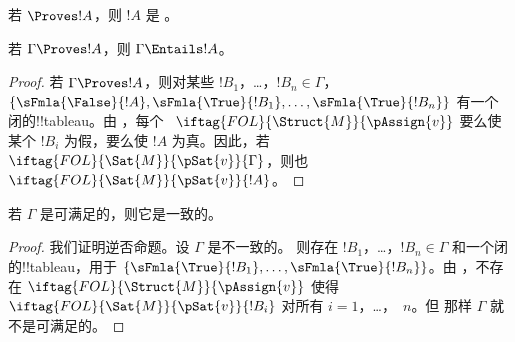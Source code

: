 \documentclass[../../../include/open-logic-section]{subfiles}
\begin{document}
\begin{cor}
若 $\Proves !A$，则 $!A$ 是 。
\end{cor}

\begin{cor}
若 $\Gamma \Proves !A$，则 $\Gamma \Entails !A$。
\end{cor}

\begin{proof}
  若 $\Gamma \Proves !A$，则对某些 $!B_1$，\dots，$!B_n \in
  \Gamma$，$\{\sFmla{\False}{!A}, \sFmla{\True}{!B_1}, \dots,
  \sFmla{\True}{!B_n}\}$ 有一个闭的!!{tableau}。由
  ，每个
  ~$\iftag{FOL}{\Struct{M}}{\pAssign{v}}$
  要么使某个 $!B_i$ 为假，要么使 $!A$ 为真。因此，若
  $\iftag{FOL}{\Sat{M}}{\pSat{v}}{\Gamma}$，则也
  $\iftag{FOL}{\Sat{M}}{\pSat{v}}{!A}$。
\end{proof}

\begin{cor}
若 $\Gamma$ 是可满足的，则它是一致的。
\end{cor}

\begin{proof}
我们证明逆否命题。设 $\Gamma$ 是不一致的。
则存在 $!B_1$，\dots，$!B_n \in \Gamma$ 和一个闭的!!{tableau}，用于 $\{\sFmla{\True}{!B_1}, \dots, \sFmla{\True}{!B_n}\}$。由
，不存在
$\iftag{FOL}{\Struct{M}}{\pAssign{v}}$ 使得
$\iftag{FOL}{\Sat{M}}{\pSat{v}}{!B_i}$ 对所有 $i=1$，\dots，~$n$。但
那样 $\Gamma$ 就不是可满足的。
\end{proof}
\end{document}
